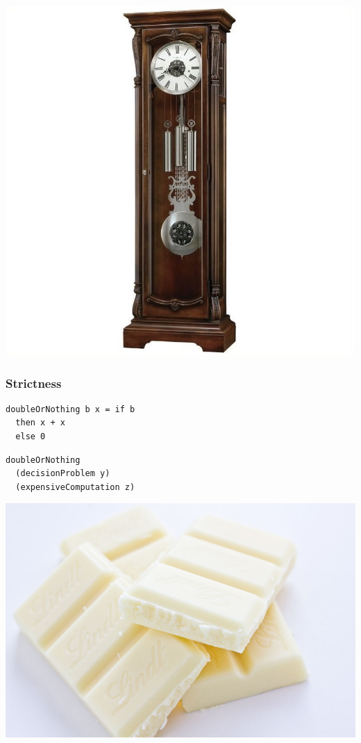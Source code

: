 \documentclass[17pt]{beamer}
\begin{document}
\begin{frame}
\hspace*{-11.2mm}
\includegraphics[width=\paperwidth]{time}
\end{frame}

\begin{frame}[fragile]
\frametitle{Strictness}
\begin{lstlisting}[frame=single]
doubleOrNothing b x = if b 
  then x + x
  else 0
\end{lstlisting}
\begin{lstlisting}[frame=single]
doubleOrNothing 
  (decisionProblem y) 
  (expensiveComputation z)
\end{lstlisting}
\end{frame}

\begin{frame}
\hspace*{-11.2mm}
\includegraphics[width=\paperwidth]{whitechocolate}
\end{frame}
\end{document}
